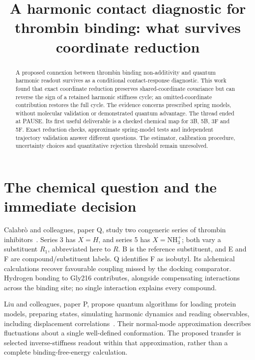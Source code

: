 \documentclass{article}
\title{A harmonic contact diagnostic for thrombin binding: what survives coordinate reduction}
\begin{document}
\maketitle

\begin{abstract}
A proposed connexion between thrombin binding non-additivity and quantum harmonic readout survives as a conditional contact-response diagnostic. This work found that exact coordinate reduction preserves shared-coordinate covariance but can reverse the sign of a retained harmonic stiffness cycle; an omitted-coordinate contribution restores the full cycle. The evidence concerns prescribed spring models, without molecular validation or demonstrated quantum advantage. The thread ended at PAUSE. Its first useful deliverable is a checked chemical map for 3B, 5B, 3F and 5F. Exact reduction checks, approximate spring-model tests and independent trajectory validation answer different questions. The estimator, calibration procedure, uncertainty choices and quantitative rejection threshold remain unresolved.
\end{abstract}

\section{The chemical question and the immediate decision}
Calabr\`o and colleagues, paper Q, study two congeneric series of thrombin inhibitors~\cite{Q}. Series 3 has \(X=H\), and series 5 has \(X=\mathrm{NH}_3^+\); both vary a substituent \(R_1\), abbreviated here to \(R\). B is the reference substituent, and E and F are compound/substituent labels. Q identifies F as isobutyl. Its alchemical calculations recover favourable coupling missed by the docking comparator. Hydrogen bonding to Gly216 contributes, alongside compensating interactions across the binding site; no single interaction explains every compound.

Liu and colleagues, paper P, propose quantum algorithms for loading protein models, preparing states, simulating harmonic dynamics and reading observables, including displacement correlations~\cite{P}. Their normal-mode approximation describes fluctuations about a single well-defined conformation. The proposed transfer is selected inverse-stiffness readout within that approximation, rather than a complete binding-free-energy calculation.
\end{document}
